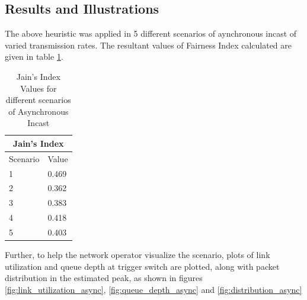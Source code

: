 \subsection{Results and Illustrations}

The above heuristic was applied in 5 different scenarios of aynchronous incast of varied transmission rates.
The resultant values of Fairness Index calculated are given in table \ref{tab:J_Index_Async}.
\begin{table}[h]
	\begin{center}
	\begin{tabular}{ |p{3cm}|p{3cm}|  }
		\hline
		\multicolumn{2}{|c|}{Jain's Index} \\
		\hline
		Scenario & Value \\
		\hline
		1 & 0.469 \\
		2 & 0.362 \\
		3 & 0.383 \\
		4 & 0.418 \\
		5 & 0.403 \\
		\hline
	   \end{tabular}
	\end{center}
	
	\caption{Jain's Index Values for different scenarios of Asynchronous Incast}
	\label{tab:J_Index_Async}
	\end{table}


Further, to help the network operator visualize the scenario, plots of link utilization and queue depth at 
trigger switch are plotted, along with packet distribution in the estimated peak, as shown in figures \ref{fig:link_utilization_async}, \ref{fig:queue_depth_async}
and \ref{fig:distribution_async}



